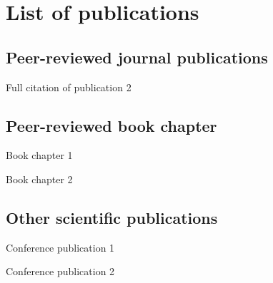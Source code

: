 \chapter[List of publications]{List of publications}

\section*{Peer-reviewed journal publications}


Full citation of publication 2


\section*{Peer-reviewed book chapter}

Book chapter 1

Book chapter 2

\section*{Other scientific publications}

Conference publication 1

Conference publication 2
